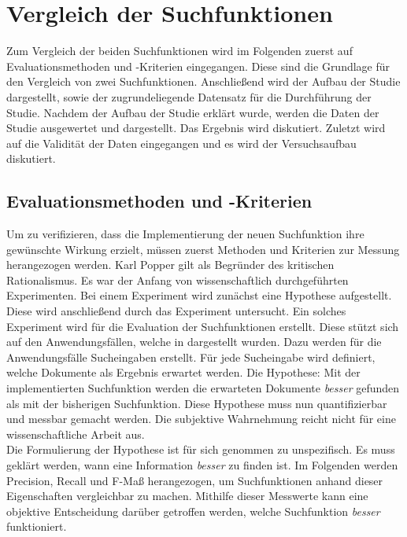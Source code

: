 \chapter{Vergleich der Suchfunktionen}
\label{chap:vergleich-der-suchfunktionen}
Zum Vergleich der beiden Suchfunktionen wird im Folgenden zuerst auf Evaluationsmethoden und -Kriterien eingegangen.
Diese sind die Grundlage für den Vergleich von zwei Suchfunktionen.
Anschließend wird der Aufbau der Studie dargestellt, sowie der zugrundeliegende Datensatz für die Durchführung der Studie.
Nachdem der Aufbau der Studie erklärt wurde, werden die Daten der Studie ausgewertet und dargestellt.
Das Ergebnis wird diskutiert.
Zuletzt wird auf die Validität der Daten eingegangen und es wird der Versuchsaufbau diskutiert.

\section{Evaluationsmethoden und -Kriterien}
\label{chap:evaluationsmethoden}
Um zu verifizieren, dass die Implementierung der neuen Suchfunktion ihre gewünschte Wirkung erzielt, müssen zuerst Methoden und Kriterien zur Messung herangezogen werden.
Karl Popper gilt als Begründer des kritischen Rationalismus.
Es war der Anfang von wissenschaftlich durchgeführten Experimenten.
Bei einem Experiment wird zunächst eine Hypothese aufgestellt.
Diese wird anschließend durch das Experiment untersucht.
Ein solches Experiment wird für die Evaluation der Suchfunktionen erstellt.
Diese stützt sich auf den Anwendungsfällen, welche in  dargestellt wurden.
Dazu werden für die Anwendungsfälle Sucheingaben erstellt.
Für jede Sucheingabe wird definiert, welche Dokumente als Ergebnis erwartet werden.
Die Hypothese: Mit der implementierten Suchfunktion werden die erwarteten Dokumente \textit{besser} gefunden als mit der bisherigen Suchfunktion.
Diese Hypothese muss nun quantifizierbar und messbar gemacht werden.
Die subjektive Wahrnehmung reicht nicht für eine wissenschaftliche Arbeit aus.\\

Die Formulierung der Hypothese ist für sich genommen zu unspezifisch.
Es muss geklärt werden, wann eine Information \textit{besser} zu finden ist.
Im Folgenden werden Precision, Recall und F-Maß herangezogen, um Suchfunktionen anhand dieser Eigenschaften vergleichbar zu machen.
Mithilfe dieser Messwerte kann eine objektive Entscheidung darüber getroffen werden, welche Suchfunktion \textit{besser} funktioniert.

